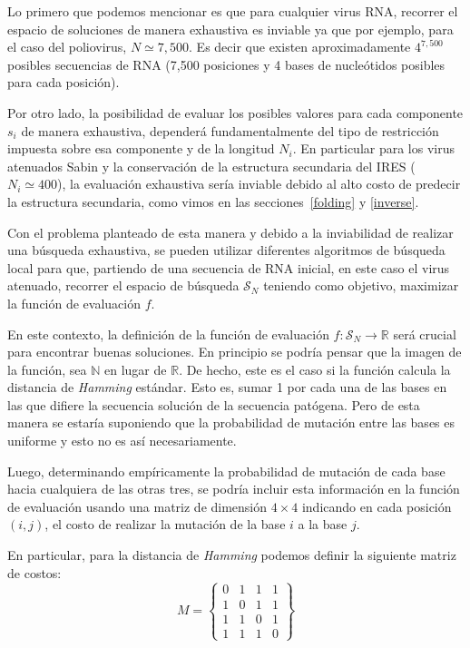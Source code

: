 Lo primero que podemos mencionar es que para cualquier virus \ac{RNA}, recorrer
el espacio de soluciones de manera exhaustiva es inviable ya que por ejemplo,
para el caso del poliovirus, $N \simeq 7,500$. Es decir que existen
aproximadamente $4^{7,500}$ posibles secuencias de \ac{RNA} (7,500
posiciones y 4 bases de nucle\'otidos posibles para cada posici\'on).

Por otro lado, la posibilidad de evaluar los posibles valores para cada
componente $s_{i}$ de manera exhaustiva, depender\'a fundamentalmente del tipo
de restricci\'on impuesta sobre esa componente y de la longitud $N_{i}$. En
particular para los virus atenuados Sabin y la conservaci\'on de la estructura
secundaria del \ac{IRES} ($N_{i} \simeq 400$), la evaluaci\'on exhaustiva
ser\'ia inviable debido al alto costo de predecir la estructura secundaria,
como vimos en las secciones~\ref{folding} y \ref{inverse}.

Con el problema planteado de esta manera y debido a la inviabilidad de realizar
una b\'usqueda exhaustiva, se pueden utilizar diferentes algoritmos de
b\'usqueda local para que, partiendo de una secuencia de \ac{RNA} inicial, en
este caso el virus atenuado, recorrer el espacio de b\'usqueda $\mathcal{S}_{N}$
teniendo como objetivo, maximizar la funci\'on de evaluaci\'on $f$.

En este contexto, la definici\'on de la funci\'on de evaluaci\'on $f:
\mathcal{S}_{N} \rightarrow \mathbb{R}$ ser\'a crucial para encontrar buenas
soluciones. En principio se podr\'ia pensar que la imagen de la funci\'on, sea
$\mathbb{N}$ en lugar de $\mathbb{R}$. De hecho, este es el caso si la funci\'on
calcula la distancia de \textit{Hamming} est\'andar. Esto es, sumar 1 por cada
una de las bases en las que difiere la secuencia soluci\'on de la secuencia
pat\'ogena. Pero de esta manera se estar\'ia suponiendo que la probabilidad de
mutaci\'on entre las bases es uniforme y esto no es as\'i necesariamente. 

Luego, determinando emp\'iricamente la probabilidad de mutaci\'on de cada base
hacia cualquiera de las otras tres, se podr\'ia incluir esta informaci\'on en la
funci\'on de evaluaci\'on usando una matriz de dimensi\'on $4\times4$ indicando
en cada posici\'on $(i,j)$, el costo de realizar la mutaci\'on de la base $i$ a
la base $j$.

En particular, para la distancia de \textit{Hamming} podemos definir la
siguiente matriz de costos:
\[
M = 
\begin{Bmatrix}
 0 & 1 & 1 & 1\\
 1 & 0 & 1 & 1\\
 1 & 1 & 0 & 1\\
 1 & 1 & 1 & 0
\end{Bmatrix}
\]

